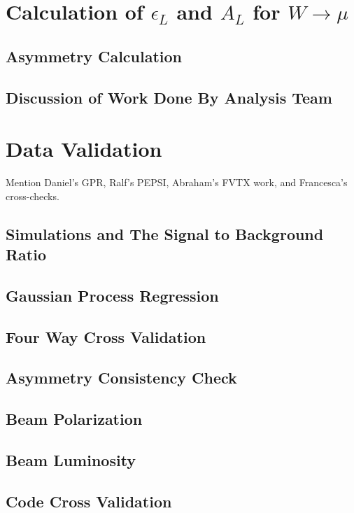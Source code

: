 \clearpage
\section{Calculation of $\epsilon_L$ and $A_{L}$ for $W\rightarrow\mu$}
\label{sec:calculate_al}
\subsection{Asymmetry Calculation}
\subsection{Discussion of Work Done By Analysis Team}

\section{Data Validation}
Mention Daniel's GPR, Ralf's PEPSI, Abraham's FVTX work, and Francesca's cross-checks.
\subsection{Simulations and The Signal to Background Ratio}
\subsection{Gaussian Process Regression}
\subsection{Four Way Cross Validation}
\subsection{Asymmetry Consistency Check}
\subsection{Beam Polarization}
\subsection{Beam Luminosity}
\subsection{Code Cross Validation}
